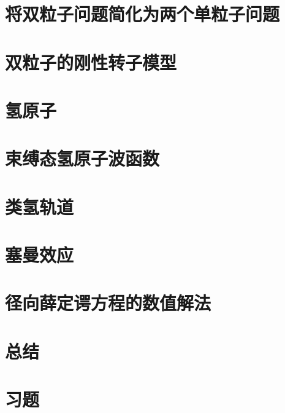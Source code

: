 \section{将双粒子问题简化为两个单粒子问题}
\label{sec:6.3 Reduction of the Two-Particle Problem to Two One-Particle Problems}

\section{双粒子的刚性转子模型}
\label{sec:6.4 The Two-Particle Rigid Rotor}

\section{氢原子}
\label{sec:6.5 The Hydrogen Atom}

\section{束缚态氢原子波函数}
\label{sec:6.6 The Bound-State Hydrogen-Atom Wave Functions}

\section{类氢轨道}
\label{sec:6.7 Hydrogenlike orbitals}

\section{塞曼效应}
\label{sec:6.8 Zeeman effect}

\section{径向薛定谔方程的数值解法}
\label{sec:6.9 Numerical Solution of the Radial Schrödinger Equation}

\section*{总结}

\section*{习题}
